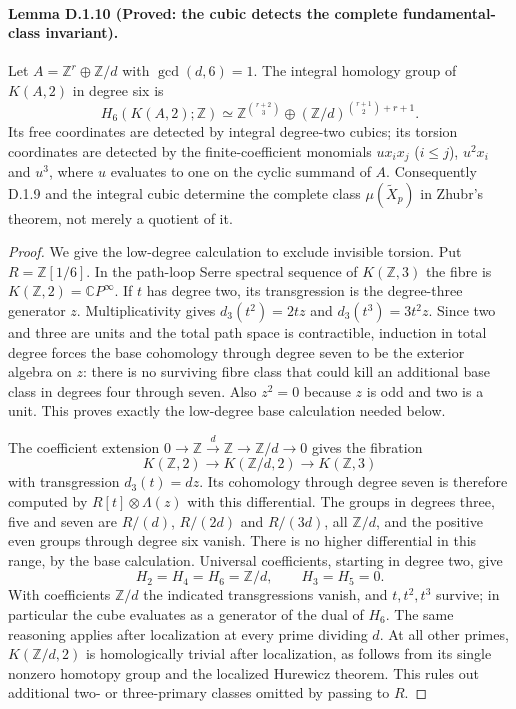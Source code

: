 \paragraph{Lemma D.1.10 (Proved: the cubic detects the complete fundamental-class invariant).}
Let $A=\mathbb Z^r\oplus\mathbb Z/d$ with $\gcd(d,6)=1$.
The integral homology group of $K(A,2)$ in degree six is
\[
 H_6(K(A,2);\mathbb Z)\simeq
 \mathbb Z^{\binom{r+2}{3}}\oplus
 (\mathbb Z/d)^{\binom{r+1}{2}+r+1}.
\]
Its free coordinates are detected by integral degree-two cubics;
its torsion coordinates are detected by the finite-coefficient
monomials $u x_i x_j$ ($i\leq j$), $u^2x_i$ and $u^3$, where
$u$ evaluates to one on the cyclic summand of $A$. Consequently
D.1.9 and the integral cubic determine the complete class
$\mu(\widetilde X_p)$ in Zhubr's theorem, not merely a quotient of it.
\begin{proof}
We give the low-degree calculation to exclude invisible torsion.
Put $R=\mathbb Z[1/6]$. In the path-loop Serre spectral sequence of
$K(\mathbb Z,3)$ the fibre is $K(\mathbb Z,2)=\mathbb CP^\infty$.
If $t$ has degree two, its transgression is the degree-three
generator $z$. Multiplicativity gives
$d_3(t^2)=2tz$ and $d_3(t^3)=3t^2z$.
Since two and three are units and the total path space is
contractible, induction in total degree forces the base cohomology
through degree seven to be the exterior algebra on $z$:
there is no surviving fibre class that could kill an additional
base class in degrees four through seven. Also $z^2=0$ because
$z$ is odd and two is a unit. This proves exactly the low-degree
base calculation needed below.

The coefficient extension
$0\to\mathbb Z\xrightarrow{d}\mathbb Z\to\mathbb Z/d\to0$
gives the fibration
\[
 K(\mathbb Z,2)\longrightarrow K(\mathbb Z/d,2)
 \longrightarrow K(\mathbb Z,3)
\]
with transgression $d_3(t)=dz$. Its cohomology through degree seven
is therefore computed by $R[t]\otimes\Lambda(z)$ with this
 differential. The groups in degrees three, five and seven are
$R/(d)$, $R/(2d)$ and $R/(3d)$, all $\mathbb Z/d$, and the positive even
groups through degree six vanish. There is no higher differential
in this range, by the base calculation. Universal coefficients,
starting in degree two, give
\[
 H_2=H_4=H_6=\mathbb Z/d,\qquad H_3=H_5=0.
\]
With coefficients $\mathbb Z/d$ the indicated transgressions vanish,
and $t,t^2,t^3$ survive; in particular the cube evaluates as a
generator of the dual of $H_6$. The same reasoning applies after
localization at every prime dividing $d$. At all other primes,
$K(\mathbb Z/d,2)$ is homologically trivial after localization,
as follows from its single nonzero homotopy group and the localized
Hurewicz theorem. This rules out additional two- or three-primary
classes omitted by passing to $R$.


\end{proof}
